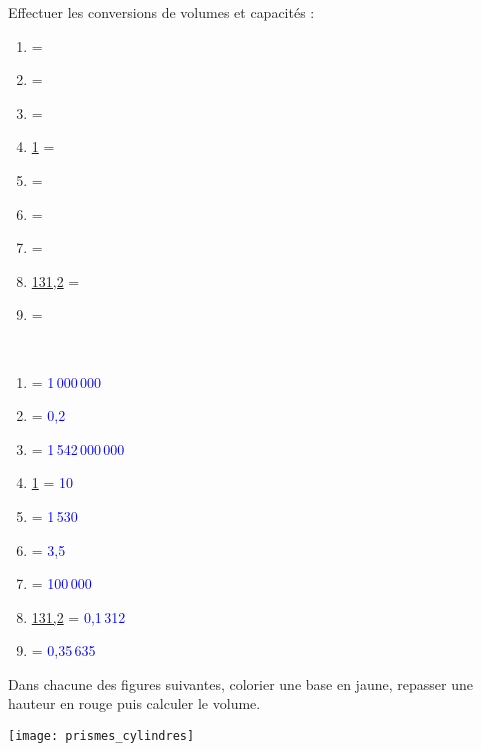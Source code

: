 \begin{colonne*exercice}
\begin{exercice} %
   Effectuer les conversions de volumes et capacités : \smallskip
   \begin{enumerate}
      \item {} = \pointilles \ummc{} \smallskip
      \item {} = \pointilles \ucmc{} \smallskip
      \item {} = \pointilles \udamc{} \smallskip
      \item \ul{1} = \pointilles \udl{} \smallskip
      \item {} = \pointilles \ucl{} \smallskip
      \item {} = \pointilles \ul{} \smallskip
      \item {} = \pointilles \ucmc{} \smallskip
      \item \ul{131,2} = \pointilles \umc{} \smallskip
      \item {} = \pointilles \udl{} \smallskip
   \end{enumerate}
\end{exercice}

\begin{corrige}
\ \\ [-5mm]
   \begin{enumerate}
      \item {} = \textcolor{blue}{1\,000\,000} \ummc{}
      \item {} = \textcolor{blue}{0,2} \ucmc{}
      \item {} = \textcolor{blue}{1\,542\,000\,000} \udamc{}
      \item \ul{1} = \textcolor{blue}{10} \udl{}
      \item {} = \textcolor{blue}{1\,530} \ucl{}
      \item {} = \textcolor{blue}{3,5} \ul{}
      \item {} = \textcolor{blue}{100\,000} \ucmc{}
      \item \ul{131,2} = \textcolor{blue}{0,1\,312} \umc{}
      \item {} = \textcolor{blue}{0,35\,635} \udl{}
   \end{enumerate}
\end{corrige}

\smallskip


\begin{exercice} %
   Dans chacune des figures suivantes, colorier une base en jaune, repasser une hauteur en rouge puis calculer le volume.
   \begin{center}
      \texttt{[image: prismes\_cylindres]}
   \end{center}
\end{exercice}


\end{colonne*exercice}
